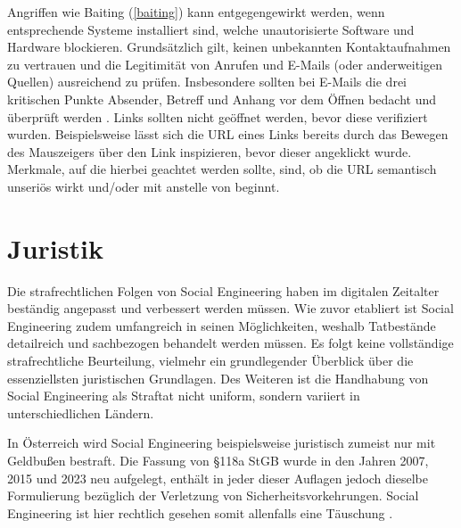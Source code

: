 Angriffen wie Baiting (\autoref{baiting}) kann entgegengewirkt werden, wenn entsprechende Systeme installiert sind, welche unautorisierte Software und Hardware blockieren.
Grundsätzlich gilt, keinen unbekannten Kontaktaufnahmen zu vertrauen  und die Legitimität von Anrufen und E-Mails (oder anderweitigen Quellen) ausreichend zu prüfen.
Insbesondere sollten bei E-Mails die drei kritischen Punkte Absender, Betreff und Anhang vor dem Öffnen bedacht und überprüft werden .
Links sollten nicht geöffnet werden, bevor diese verifiziert wurden. Beispielsweise lässt sich die URL eines Links bereits durch das Bewegen des Mauszeigers über den Link inspizieren, bevor dieser angeklickt wurde.
Merkmale, auf die hierbei geachtet werden sollte, sind, ob die URL semantisch unseriös wirkt und/oder mit  anstelle von  beginnt. 

\section{Juristik}

Die strafrechtlichen Folgen von Social Engineering haben im digitalen Zeitalter beständig angepasst und verbessert werden müssen.
Wie zuvor etabliert ist Social Engineering zudem umfangreich in seinen Möglichkeiten, weshalb Tatbestände detailreich und sachbezogen behandelt werden müssen.
Es folgt keine vollständige strafrechtliche Beurteilung, vielmehr ein grundlegender Überblick über die essenziellsten juristischen Grundlagen.
Des Weiteren ist die Handhabung von Social Engineering als Straftat nicht uniform, sondern variiert in unterschiedlichen Ländern.

In Österreich wird Social Engineering beispielsweise juristisch zumeist nur mit Geldbußen bestraft.
Die Fassung von §118a StGB wurde in den Jahren 2007, 2015 und 2023 neu aufgelegt, enthält in jeder dieser Auflagen jedoch dieselbe Formulierung bezüglich der Verletzung von Sicherheitsvorkehrungen.
Social Engineering ist hier rechtlich gesehen somit allenfalls eine Täuschung .

